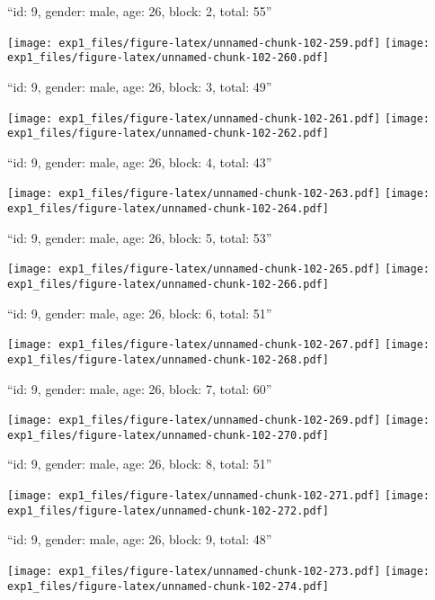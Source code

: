 \documentclass[11pt,,]{article}
\begin{document}
\newpage
[1] 

``id: 9, gender: male, age: 26, block: 2, total: 55''

\texttt{[image: exp1\_files/figure-latex/unnamed-chunk-102-259.pdf]}
\texttt{[image: exp1\_files/figure-latex/unnamed-chunk-102-260.pdf]}

\newpage
[1] 

``id: 9, gender: male, age: 26, block: 3, total: 49''

\texttt{[image: exp1\_files/figure-latex/unnamed-chunk-102-261.pdf]}
\texttt{[image: exp1\_files/figure-latex/unnamed-chunk-102-262.pdf]}

\newpage
[1] 

``id: 9, gender: male, age: 26, block: 4, total: 43''

\texttt{[image: exp1\_files/figure-latex/unnamed-chunk-102-263.pdf]}
\texttt{[image: exp1\_files/figure-latex/unnamed-chunk-102-264.pdf]}

\newpage
[1] 

``id: 9, gender: male, age: 26, block: 5, total: 53''

\texttt{[image: exp1\_files/figure-latex/unnamed-chunk-102-265.pdf]}
\texttt{[image: exp1\_files/figure-latex/unnamed-chunk-102-266.pdf]}

\newpage
[1] 

``id: 9, gender: male, age: 26, block: 6, total: 51''

\texttt{[image: exp1\_files/figure-latex/unnamed-chunk-102-267.pdf]}
\texttt{[image: exp1\_files/figure-latex/unnamed-chunk-102-268.pdf]}

\newpage
[1] 

``id: 9, gender: male, age: 26, block: 7, total: 60''

\texttt{[image: exp1\_files/figure-latex/unnamed-chunk-102-269.pdf]}
\texttt{[image: exp1\_files/figure-latex/unnamed-chunk-102-270.pdf]}

\newpage
[1] 

``id: 9, gender: male, age: 26, block: 8, total: 51''

\texttt{[image: exp1\_files/figure-latex/unnamed-chunk-102-271.pdf]}
\texttt{[image: exp1\_files/figure-latex/unnamed-chunk-102-272.pdf]}

\newpage
[1] 

``id: 9, gender: male, age: 26, block: 9, total: 48''

\texttt{[image: exp1\_files/figure-latex/unnamed-chunk-102-273.pdf]}
\texttt{[image: exp1\_files/figure-latex/unnamed-chunk-102-274.pdf]}
\end{document}
